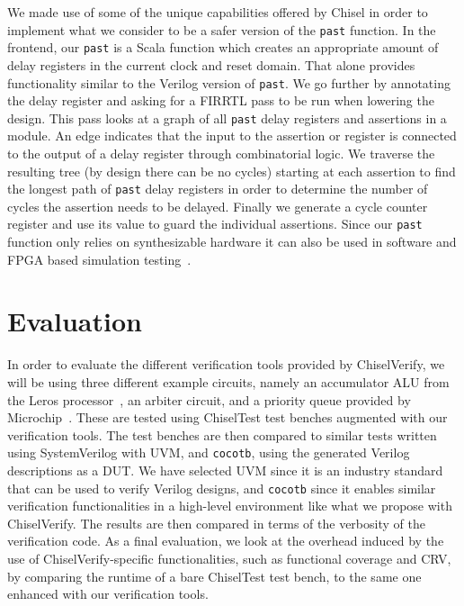 \documentclass[conference]{IEEEtran}
\newcommand{\code}[1]{{\small{\texttt{#1}}}}
\begin{document}
We made use of some of the unique capabilities offered by Chisel in order to implement what we consider to be a safer version of the
\code{past} function.
In the frontend, our \code{past} is a Scala function which creates an appropriate amount of delay registers in the current
clock and reset domain. That alone provides functionality similar to the Verilog version of \code{past}.
We go further by annotating the delay register and asking for a FIRRTL pass to be run when lowering the design.
This pass looks at a graph of all \code{past} delay registers and assertions in a module.
An edge indicates that the input to the assertion or register is connected to the output of a delay register through combinatorial logic.
We traverse the resulting tree (by design there can be no cycles) starting at each assertion
to find the longest path of \code{past} delay registers in order to determine the number of cycles the assertion needs to be delayed.
Finally we generate a cycle counter register and use its value to guard the individual assertions.
Since our \code{past} function only relies on synthesizable hardware it can also be used in software and FPGA based
simulation testing~\cite{karandikar2018firesim}.



\section{Evaluation}
\label{sec:eval}

In order to evaluate the different verification tools provided by ChiselVerify, we will be using three different example circuits, namely an accumulator ALU from the Leros processor~\cite{leros:arcs2019}, an arbiter circuit, and a priority queue provided by Microchip~\cite{microchip}.
These are tested using ChiselTest test benches augmented with our verification tools.
The test benches are then compared to similar tests written using SystemVerilog with UVM, and \texttt{cocotb}, using the generated Verilog descriptions as a DUT.
We have selected UVM since it is an industry standard that can be used to verify Verilog designs, and \texttt{cocotb} since it enables similar verification functionalities in a high-level environment like what we propose with ChiselVerify.
The results are then compared in terms of the verbosity of the verification code.
As a final evaluation, we look at the overhead induced by the use of ChiselVerify-specific functionalities, such as functional coverage and CRV, by comparing the runtime of a bare ChiselTest test bench, to the same one enhanced with our verification tools.
\end{document}

